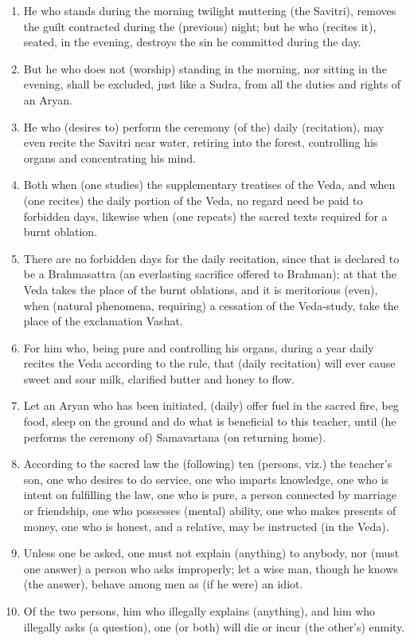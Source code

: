 \begin{enumerate}
\item He who stands during the morning twilight muttering (the Savitri), removes the guilt contracted during the (previous) night; but he who (recites it), seated, in the evening, destroys the sin he committed during the day.
\item But he who does not (worship) standing in the morning, nor sitting in the evening, shall be excluded, just like a Sudra, from all the duties and rights of an Aryan.
\item He who (desires to) perform the ceremony (of the) daily (recitation), may even recite the Savitri near water, retiring into the forest, controlling his organs and concentrating his mind.
\item Both when (one studies) the supplementary treatises of the Veda, and when (one recites) the daily portion of the Veda, no regard need be paid to forbidden days, likewise when (one repeats) the sacred texts required for a burnt oblation.
\item There are no forbidden days for the daily recitation, since that is declared to be a Brahmasattra (an everlasting sacrifice offered to Brahman); at that the Veda takes the place of the burnt oblations, and it is meritorious (even), when (natural phenomena, requiring) a cessation of the Veda-study, take the place of the exclamation Vashat.
\item For him who, being pure and controlling his organs, during a year daily recites the Veda according to the rule, that (daily recitation) will ever cause sweet and sour milk, clarified butter and honey to flow.
\item Let an Aryan who has been initiated, (daily) offer fuel in the sacred fire, beg food, sleep on the ground and do what is beneficial to this teacher, until (he performs the ceremony of) Samavartana (on returning home).
\item According to the sacred law the (following) ten (persons, viz.) the teacher's son, one who desires to do service, one who imparts knowledge, one who is intent on fulfilling the law, one who is pure, a person connected by marriage or friendship, one who possesses (mental) ability, one who makes presents of money, one who is honest, and a relative, may be instructed (in the Veda).
\item Unless one be asked, one must not explain (anything) to anybody, nor (must one answer) a person who asks improperly; let a wise man, though he knows (the answer), behave among men as (if he were) an idiot.
\item Of the two persons, him who illegally explains (anything), and him who illegally asks (a question), one (or both) will die or incur (the other's) enmity.

\end{enumerate}
